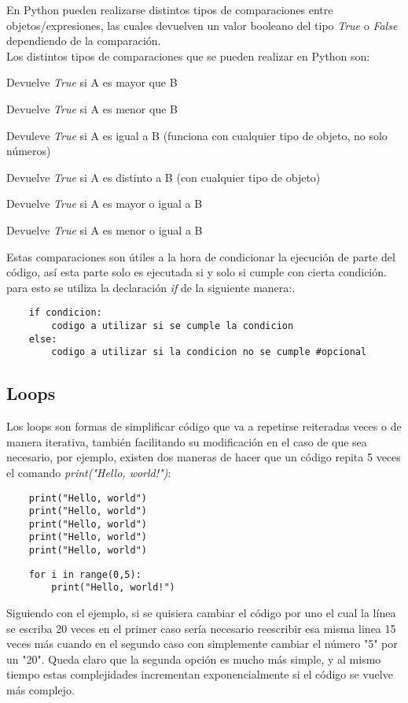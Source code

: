 \documentclass[10pt,a4paper]{article}
\begin{document}
	En Python pueden realizarse distintos tipos de comparaciones entre objetos/expresiones, las cuales devuelven un valor booleano del tipo \emph{True} o \emph{False} dependiendo de la comparación.\\
	Los distintos tipos de comparaciones que se pueden realizar en Python son:\\
	\begin{description}[leftmargin=!, labelwidth=2.5cm,itemindent=0cm]
		\item [A $>$ B] Devuelve \emph{True} si A es mayor que B
		\item [A $<$ B] Devuelve \emph{True} si A es menor que B
		\item [A == B] Devuleve \emph{True} si A es igual a B (funciona con cualquier tipo de objeto, no solo números)
		\item [A != B] Devuelve \emph{True} si A es distinto a B (con cualquier tipo de objeto) 
		\item [A $>=$ B] Devuelve \emph{True} si A es mayor o igual a B
		\item [A $<=$ B] Devuelve \emph{True} si A es menor o igual a B
	\end{description}

\noindent Estas comparaciones son útiles a la hora de condicionar la ejecución de parte del código, así esta parte solo es ejecutada si y solo si cumple con cierta condición. para esto se utiliza la declaración \emph{if} de la siguiente manera:.
	\begin{lstlisting}
	if condicion:
	    codigo a utilizar si se cumple la condicion
	else:
	    codigo a utilizar si la condicion no se cumple #opcional\end{lstlisting}
\subsection{Loops}
Los loops son formas de simplificar código que va a repetirse reiteradas veces o de manera iterativa, también facilitando su modificación en el caso de que sea necesario, por ejemplo, existen dos maneras de hacer que un código repita 5 veces el comando \emph{print("Hello, world!")}:
\begin{multicols}{2}

	\begin{lstlisting}
	print("Hello, world")
	print("Hello, world")
	print("Hello, world")
	print("Hello, world")
	print("Hello, world")\end{lstlisting}
	\vfill\null \columnbreak
	\noindent
	\begin{lstlisting}
	for i in range(0,5):
		print("Hello, world!")\end{lstlisting}
\end{multicols}
\noindent Siguiendo con el ejemplo, si se quisiera cambiar el código por uno el cual la línea se escriba 20 veces en el primer caso sería necesario reescribir esa misma linea 15 veces más cuando en el segundo caso con simplemente cambiar el número "5" por un "20". Queda claro que la segunda opción es mucho más simple, y al mismo tiempo estas complejidades incrementan exponencialmente si el código se vuelve más complejo.
\end{document}
